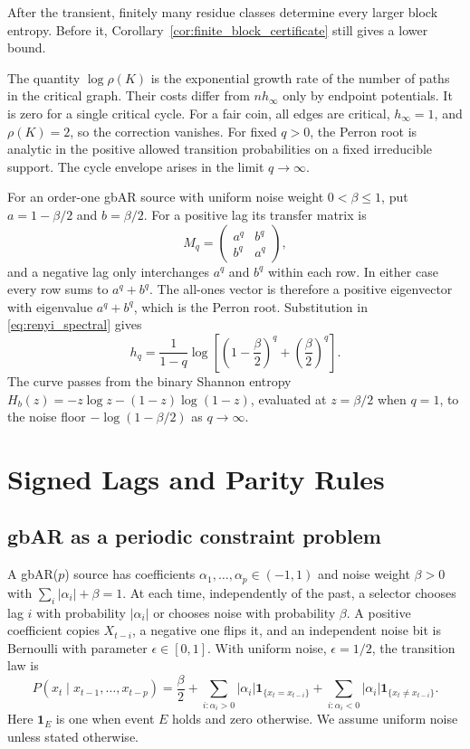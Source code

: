 \documentclass[11pt,a4paper]{article}
\providecommand{\mathds}[1]{\mathbf{#1}}
\begin{document}
After the transient, finitely many residue classes determine every
larger block entropy.  Before it, Corollary~\ref{cor:finite_block_certificate}
still gives a lower bound.

The quantity $\log\rho(K)$ is the exponential growth rate of the
number of paths in the critical graph.  Their costs differ from
$nh_\infty$ only by endpoint potentials.  It is zero for a single
critical cycle.  For a fair coin, all edges are critical,
$h_\infty=1$, and $\rho(K)=2$, so the correction vanishes.
For fixed $q>0$, the Perron root is analytic in the positive allowed
transition probabilities on a fixed irreducible support.  The cycle
envelope arises in the limit $q\to\infty$.

For an order-one gbAR source with uniform noise weight
$0<\beta\le1$, put $a=1-\beta/2$ and $b=\beta/2$.  For a positive lag its transfer matrix
is
\[
    M_q=\begin{pmatrix}a^q&b^q\\ b^q&a^q\end{pmatrix},
\]
and a negative lag only interchanges $a^q$ and $b^q$ within each row.
In either case every row sums to $a^q+b^q$.  The all-ones vector is
therefore a positive eigenvector with eigenvalue $a^q+b^q$, which is
the Perron root.  Substitution in \eqref{eq:renyi_spectral} gives
\begin{equation}
\label{eq:gbar1_renyi}
    h_q=\frac{1}{1-q}\log\left[
        \left(1-\frac{\beta}{2}\right)^q
        +\left(\frac{\beta}{2}\right)^q
    \right].
\end{equation}
The curve passes from the binary Shannon entropy
$H_b(z)=-z\log z-(1-z)\log(1-z)$, evaluated at $z=\beta/2$
when $q=1$, to the noise floor
$-\log(1-\beta/2)$ as $q\to\infty$.

\section{Signed Lags and Parity Rules}
\label{sec:signed_rules}

\subsection{gbAR as a periodic constraint problem}

A gbAR($p$) source has coefficients
$\alpha_1,\ldots,\alpha_p\in(-1,1)$ and noise weight $\beta>0$ with
$\sum_i|\alpha_i|+\beta=1$.  At each time, independently of the
past, a selector chooses lag
$i$ with probability $|\alpha_i|$ or chooses noise with probability
$\beta$.  A positive coefficient copies $X_{t-i}$, a negative one
flips it, and an independent noise bit is Bernoulli with parameter
$\epsilon\in[0,1]$.
With uniform noise, $\epsilon=1/2$, the transition law is
\begin{equation}
\label{eq:gbar_transition}
P(x_t\mid x_{t-1},\ldots,x_{t-p})
=\frac{\beta}{2}
+\sum_{i:\alpha_i>0}|\alpha_i|\mathds{1}_{\{x_t=x_{t-i}\}}
+\sum_{i:\alpha_i<0}|\alpha_i|\mathds{1}_{\{x_t\ne x_{t-i}\}}.
\end{equation}
Here $\mathds{1}_{E}$ is one when event $E$ holds and zero otherwise.
We assume uniform noise unless stated otherwise.
\end{document}
